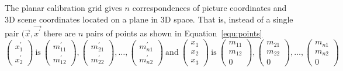 \documentclass[12pt,a4paper,oneside,openright]{book}
\newcommand{\Ie}{That is, }
\newcommand{\equ}[1]{Equation~\ref{equ:#1}}
\begin{document}
\begin{CJK}{UTF8}{}
The planar calibration grid gives $n$ correspondences of picture coordinates and \ac{3D} scene coordinates located on a plane in \ac{3D} space. \Ie instead of a single pair $(\vec{x},\vec{x^\prime}$ there are $n$ pairs of points as shown in \equ{points}
\begin{equation}\label{equ:points}
  \begin{pmatrix}x^\prime_1\\x^\prime_2\end{pmatrix}\mathrm{\ is\ }
  \begin{pmatrix}m^\prime_{11}\\m^\prime_{12}\end{pmatrix},
  \begin{pmatrix}m^\prime_{21}\\m^\prime_{22}\end{pmatrix},\ldots,
  \begin{pmatrix}m^\prime_{n1}\\m^\prime_{n2}\end{pmatrix}\mathrm{\ and\ }
  \begin{pmatrix}x_1\\x_2\\x_3\end{pmatrix}\mathrm{\ is\ }
  \begin{pmatrix}m_{11}\\m_{12}\\0\end{pmatrix},
  \begin{pmatrix}m_{21}\\m_{22}\\0\end{pmatrix},\ldots,
  \begin{pmatrix}m_{n1}\\m_{n2}\\0\end{pmatrix}
\end{equation}


\end{CJK}
\end{document}
